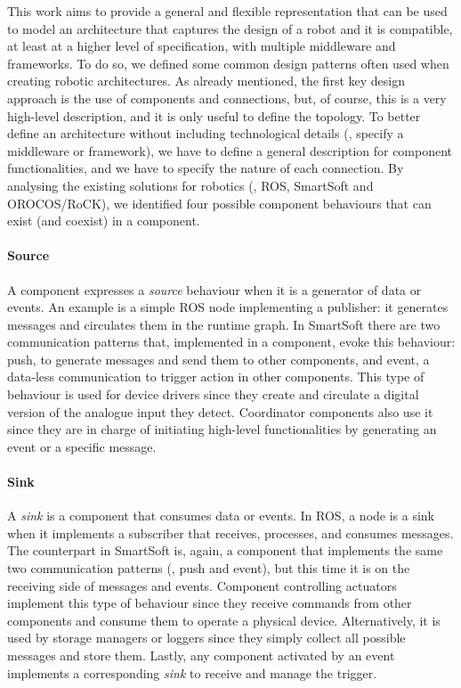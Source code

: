 This work aims to provide a general and flexible representation that can be used to model an architecture that captures the design of a robot and it is compatible, at least at a higher level of specification, with multiple middleware and frameworks. To do so, we defined some common design patterns often used when creating robotic architectures. As already mentioned, the first key design approach is the use of components and connections, but, of course, this is a very high-level description, and it is only useful to define the topology. To better define an architecture without including technological details (\ie, specify a middleware or framework), we have to define a general description for component functionalities, and we have to specify the nature of each connection. By analysing the existing solutions for robotics (\ie, ROS, SmartSoft and OROCOS/RoCK), we identified four possible component behaviours that can exist (and coexist) in a component.

\paragraph{Source} A component expresses a \textit{source} behaviour when it is a generator of data or events. An example is a simple ROS node implementing a publisher: it generates messages and circulates them in the runtime graph. In SmartSoft there are two communication patterns that, implemented in a component, evoke this behaviour: push, to generate messages and send them to other components, and event, a data-less communication to trigger action in other components. This type of behaviour is used for device drivers since they create and circulate a digital version of the analogue input they detect. Coordinator components also use it since they are in charge of initiating high-level functionalities by generating an event or a specific message.

\paragraph{Sink} A \textit{sink} is a component that consumes data or events. In ROS, a node is a sink when it implements a subscriber that receives, processes, and consumes messages. The counterpart in SmartSoft is, again, a component that implements the same two communication patterns (\ie, push and event), but this time it is on the receiving side of messages and events. Component controlling actuators implement this type of behaviour since they receive commands from other components and consume them to operate a physical device. Alternatively, it is used by storage managers or loggers since they simply collect all possible messages and store them. Lastly, any component activated by an event implements a corresponding \textit{sink} to receive and manage the trigger.


